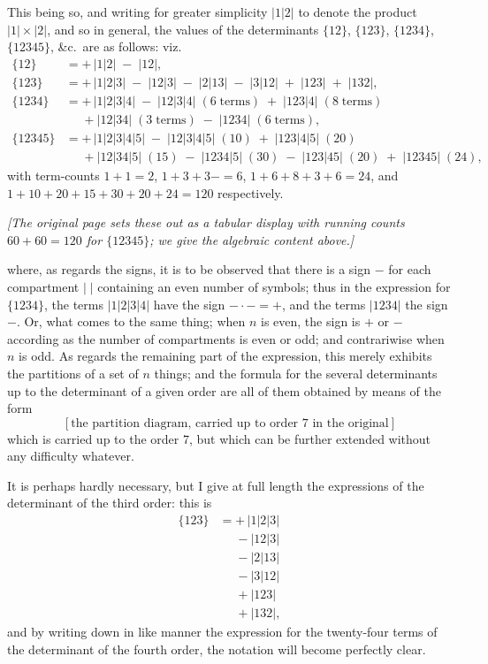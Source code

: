 \documentclass[11pt,a4paper]{article}
\begin{document}
This being so, and writing for greater simplicity $|1|2|$ to denote the product $|1|\times|2|$, and so in general, the values of the determinants $\{12\}$, $\{123\}$, $\{1234\}$, $\{12345\}$, \&c.\ are as follows: viz.
\begin{align*}
\{12\}   &= +\,|1|2| \;-\; |12|, \\
\{123\}  &= +\,|1|2|3| \;-\; |12|3| \;-\; |2|13| \;-\; |3|12| \;+\; |123| \;+\; |132|, \\
\{1234\} &= +\,|1|2|3|4| \;-\; |12|3|4|\;(6\;\text{terms}) \;+\; |123|4|\;(8\;\text{terms}) \\
         & \phantom{={}}{}+ |12|34|\;(3\;\text{terms}) \;-\; |1234|\;(6\;\text{terms}), \\
\{12345\} &= +\,|1|2|3|4|5| \;-\; |12|3|4|5|\;(10) \;+\; |123|4|5|\;(20) \\
         & \phantom{={}}{}+ |12|34|5|\;(15) \;-\; |1234|5|\;(30) \;-\; |123|45|\;(20) \;+\; |12345|\;(24),
\end{align*}
with term-counts $1+1=2$, $1+3+3-=6$, $1+6+8+3+6=24$, and $1+10+20+15+30+20+24=120$ respectively.

\medskip

\noindent\textit{[The original page sets these out as a tabular display with running counts $60+60=120$ for $\{12345\}$; we give the algebraic content above.]}

\medskip

\noindent where, as regards the signs, it is to be observed that there is a sign $-$ for each compartment $|\;|$ containing an even number of symbols; thus in the expression for $\{1234\}$, the terms $|1|2|3|4|$ have the sign $-\cdot-=+$, and the terms $|1234|$ the sign $-$. Or, what comes to the same thing; when $n$ is even, the sign is $+$ or $-$ according as the number of compartments is even or odd; and contrariwise when $n$ is odd. As regards the remaining part of the expression, this merely exhibits the partitions of a set of $n$ things; and the formula for the several determinants up to the determinant of a given order are all of them obtained by means of the form
\[
[\text{the partition diagram, carried up to order 7 in the original}]
\]
which is carried up to the order 7, but which can be further extended without any difficulty whatever.

It is perhaps hardly necessary, but I give at full length the expressions of the determinant of the third order: this is
\begin{align*}
\{123\} &= +\,|1|2|3| \\
&\phantom{={}}{}-|12|3|\\
&\phantom{={}}{}-|2|13|\\
&\phantom{={}}{}-|3|12|\\
&\phantom{={}}{}+|123|\\
&\phantom{={}}{}+|132|,
\end{align*}
and by writing down in like manner the expression for the twenty-four terms of the determinant of the fourth order, the notation will become perfectly clear.
\end{document}
